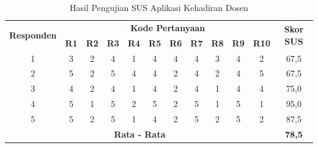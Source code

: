 \begin{table}[H]
	\fontsize{10}{12}\selectfont
	\center
	\caption{Hasil Pengujian SUS Aplikasi Kehadiran Dosen}
	\label{sus-aplikasi-dosen}
	\begin{tabular}{|c|c|c|c|c|c|c|c|c|c|c|c|}
		\hline
		\multirow{2}{*}{\textbf{Responden}}         & \multicolumn{10}{c|}{\textbf{Kode Pertanyaan}} & \multirow{2}{*}{\textbf{Skor SUS}}                                                                                                                                              \\ \cline{2-11}
		                                            & \textbf{R1}                                    & \textbf{R2}                        & \textbf{R3} & \textbf{R4} & \textbf{R5} & \textbf{R6} & \textbf{R7} & \textbf{R8} & \textbf{R9} & \multicolumn{1}{l|}{\textbf{R10}} &      \\ \hline
		1                                           & 3                                              & 2                                  & 4           & 1           & 4           & 4           & 4           & 3           & 4           & 2                                 & 67,5 \\ \hline
		2                                           & 5                                              & 2                                  & 5           & 4           & 4           & 2           & 4           & 2           & 4           & 5                                 & 67,5 \\ \hline
		3                                           & 4                                              & 2                                  & 4           & 1           & 4           & 2           & 4           & 1           & 4           & 4                                 & 75,0 \\ \hline
		4                                           & 5                                              & 1                                  & 5           & 2           & 5           & 2           & 5           & 1           & 5           & 1                                 & 95,0 \\ \hline
		5                                           & 5                                              & 2                                  & 5           & 1           & 4           & 2           & 5           & 2           & 5           & 2                                 & 87,5 \\ \hline
		\multicolumn{11}{|c|}{\textbf{Rata - Rata}} & \textbf{78,5}                                                                                                                                                                                                                    \\ \hline
	\end{tabular}
\end{table}


